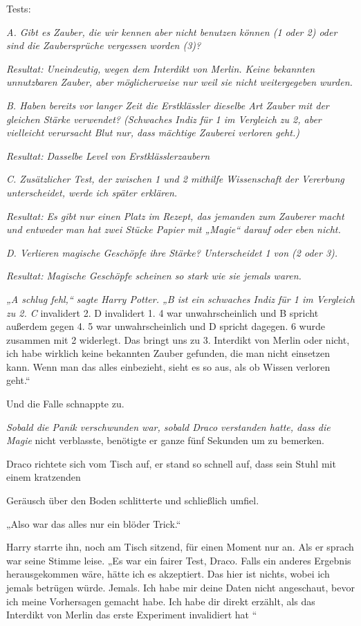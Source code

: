 {Tests:

\emph{A. Gibt es Zauber, die wir kennen aber nicht benutzen können (1 oder 2) oder sind die Zaubersprüche vergessen worden (3)?}

\emph{Resultat: Uneindeutig, wegen dem Interdikt von Merlin. Keine bekannten unnutzbaren Zauber, aber möglicherweise nur weil sie nicht weitergegeben wurden.}

\emph{B. Haben bereits vor langer Zeit die Erstklässler dieselbe Art Zauber mit der gleichen Stärke verwendet? (Schwaches Indiz für 1 im Vergleich zu 2, aber vielleicht verursacht Blut nur, dass mächtige Zauberei verloren geht.)}

\emph{Resultat: Dasselbe Level von Erstklässlerzaubern}

\emph{C. Zusätzlicher Test, der zwischen 1 und 2 mithilfe Wissenschaft der Vererbung unterscheidet, werde ich später erklären.}

\emph{Resultat: Es gibt nur einen Platz im Rezept, das jemanden zum Zauberer macht und entweder man hat zwei Stücke Papier mit „Magie“ darauf oder eben nicht.}

\emph{D. Verlieren magische Geschöpfe ihre Stärke? Unterscheidet 1 von (2 oder 3).}

\emph{Resultat: Magische Geschöpfe scheinen so stark wie sie jemals waren.}

\emph{„A schlug fehl,“ sagte Harry Potter. „B ist ein schwaches Indiz für 1 im Vergleich zu 2. C} invalidert 2. D invalidert 1. 4 war unwahrscheinlich und B spricht außerdem gegen 4. 5 war unwahrscheinlich und D spricht dagegen. 6 wurde zusammen mit 2 widerlegt. Das bringt uns zu 3. Interdikt von Merlin oder nicht, ich habe wirklich keine bekannten Zauber gefunden, die man nicht einsetzen kann. Wenn man das alles einbezieht, sieht es so aus, als ob Wissen verloren geht.“

Und die Falle schnappte zu.

\emph{Sobald die Panik verschwunden war, sobald Draco verstanden hatte, dass die Magie} nicht verblasste, benötigte er ganze fünf Sekunden um zu bemerken.

Draco richtete sich vom Tisch auf, er stand so schnell auf, dass sein Stuhl mit einem kratzenden

Geräusch über den Boden schlitterte und schließlich umfiel.

„Also war das alles nur ein blöder Trick.“

Harry starrte ihn, noch am Tisch sitzend, für einen Moment nur an. Als er sprach war seine Stimme leise. „Es war ein fairer Test, Draco. Falls ein anderes Ergebnis herausgekommen wäre, hätte ich es akzeptiert. Das hier ist nichts, wobei ich jemals betrügen würde. Jemals. Ich habe mir deine Daten nicht angeschaut, bevor ich meine Vorhersagen gemacht habe. Ich habe dir direkt erzählt, als das Interdikt von Merlin das erste Experiment invalidiert hat \later“

}
